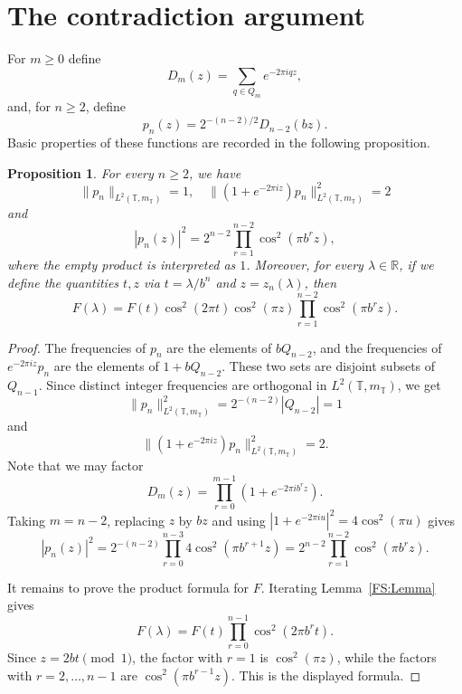\documentclass[reqno,a4paper,12pt]{amsart}
\newtheorem{proposition}[definition]{Proposition}
\def\R{{\mathbb R}}
\def\T{{\mathbb T}}
\begin{document}
\section{The contradiction argument}
For $m\ge0$ define
$$
        D_m(z)=\sum_{q\in Q_m}e^{-2\pi iqz},
$$
and, for $n\ge2$, define
$$
        p_n(z)=2^{-(n-2)/2}D_{n-2}(bz).
$$
Basic properties of these functions are recorded in the following proposition.
\begin{proposition}\label{prop:test-polynomials}
For every $n\ge2$, we have
\begin{equation*}\label{eq:test-norms}
        \|p_n\|_{L^2(\T,m_\T)}=1,
        \quad
        \|(1+e^{-2\pi iz})p_n\|_{L^2(\T,m_\T)}^2=2
\end{equation*}
and
\begin{equation}\label{eq:pn-product}
        |p_n(z)|^2
        =
        2^{n-2}\prod_{r=1}^{n-2}\cos^2(\pi b^rz),
\end{equation}
where the empty product is interpreted as $1$. Moreover, for every $\lambda \in \R$, if we define the quantities $t,z$ via $t=\lambda/b^n$ and $z=z_n(\lambda)$, then
\begin{equation}\label{eq:F-product}
        F(\lambda)
        =
        F(t)\cos^2(2\pi t)\cos^2(\pi z)
        \prod_{r=1}^{n-2}\cos^2(\pi b^rz).
\end{equation}
\end{proposition}

\begin{proof}
The frequencies of $p_n$ are the elements of $bQ_{n-2}$, and the
frequencies of $e^{-2\pi iz}p_n$ are the elements of $1+bQ_{n-2}$.
These two sets are disjoint subsets of $Q_{n-1}$. Since distinct integer
frequencies are orthogonal in $L^2(\T,m_\T)$, we get
$$
        \|p_n\|_{L^2(\T,m_\T)}^2
        =
        2^{-(n-2)}|Q_{n-2}|
        =
        1
$$
and
$$
        \|(1+e^{-2\pi iz})p_n\|_{L^2(\T,m_\T)}^2
        =
        2.
$$
Note that we may factor
$$
        D_m(z)=\prod_{r=0}^{m-1}\left(1+e^{-2\pi ib^rz}\right).
$$
Taking $m=n-2$, replacing $z$ by $bz$ and using
$
        |1+e^{-2\pi iu}|^2=4\cos^2(\pi u)
$
gives
$$
        |p_n(z)|^2
        =
        2^{-(n-2)}
        \prod_{r=0}^{n-3}4\cos^2(\pi b^{r+1}z)
        =
        2^{n-2}\prod_{r=1}^{n-2}\cos^2(\pi b^rz).
$$

It remains to prove the product formula for $F$. Iterating Lemma~\ref{FS:Lemma} gives
$$
        F(\lambda)
        =
        F(t)\prod_{r=0}^{n-1}\cos^2(2\pi b^rt).
$$
Since $z=2bt\pmod1$, the factor with $r=1$ is
$\cos^2(\pi z)$, while the factors with $r=2,\ldots,n-1$ are
$\cos^2(\pi b^{r-1}z)$. This is the displayed formula.
\end{proof}
\end{document}
